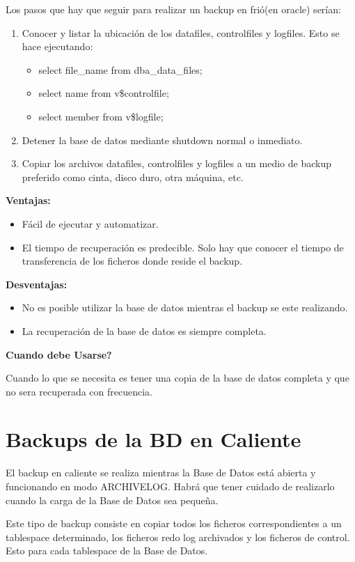 Los pasos que hay que seguir para realizar un backup en frió(en oracle) serían:

\begin{enumerate}
\item Conocer y listar la ubicación de los datafiles, controlfiles y logfiles. Esto se hace ejecutando:
\begin{itemize}
\item select file\_name from dba\_data\_files; 
\item select name from v\$controlfile;
\item select member from v\$logfile;
\end{itemize}
\item Detener la base de datos mediante shutdown normal o inmediato.
\item Copiar los archivos datafiles, controlfiles y logfiles a un medio de backup preferido como cinta, disco duro, otra máquina, etc.
\end{enumerate}

\textbf{Ventajas:}
\begin{itemize}
\item Fácil de ejecutar y automatizar.
\item El tiempo de recuperación es predecible. Solo hay que conocer el tiempo de transferencia de los ficheros donde reside el backup.
\end{itemize}

\textbf{Desventajas:}
\begin{itemize}
\item No es posible utilizar la base de datos mientras el backup se este realizando.
\item La recuperación de la base de datos es siempre completa.
\end{itemize}

\textbf{Cuando debe Usarse?}

Cuando lo que se necesita es tener una copia de la base de datos completa y que no
sera recuperada con frecuencia.


\section{Backups de la BD en Caliente}
El backup en caliente se realiza mientras la Base de Datos está abierta y funcionando en modo ARCHIVELOG. Habrá que tener cuidado de realizarlo cuando la carga de la Base de Datos sea pequeña.

Este tipo de backup consiste en copiar todos los ficheros correspondientes a un tablespace determinado, los ficheros redo log archivados y los ficheros de control. Esto para cada tablespace de la Base de Datos.

